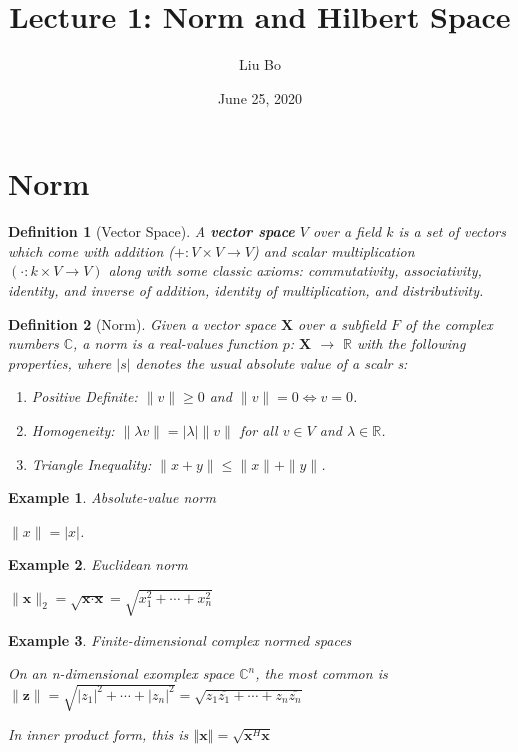 \documentclass[11pt]{article}
\title{Lecture 1: Norm and Hilbert Space}
\author{Liu Bo}
\date{June 25, 2020}
\newtheorem{definition}{Definition}
\newtheorem{example}{Example}
\begin{document}
\maketitle

\section{Norm}
\begin{definition}[Vector Space]
A \textbf{vector space} $V$ over a field $k$ is a set of vectors which come with addition ($+: V\times V \to V$) and scalar multiplication $(\cdot: k\times V\to V)$ along with some classic axioms: commutativity, associativity, identity, and inverse of addition, identity of multiplication, and distributivity.
\end{definition}

\begin{definition}[Norm]
Given a vector space $\textbf{X}$ over a subfield $F$ of the complex numbers $\mathbb{C}$, a norm is a real-values function $p$: $\textbf{X}$  $\to$ $\mathbb{R}$ with the following properties, where $|s|$ denotes the usual absolute value of a scalr s:
\begin{enumerate}
\item Positive Definite: $\| v\| \geq 0$ and $\| v\| = 0 \iff v = 0$.
\item Homogeneity: $\| \lambda v\| = |\lambda| \| v\|$ for all $v\in V$ and $\lambda \in \mathbb{R}$.
\item Triangle Inequality: $\| x+y\| \leq \| x\| + \| y\|$.
\end{enumerate}

\end{definition}

\begin{example}{Absolute-value norm}

$\| x\| = |x|$.
\end{example}

\begin{example}{Euclidean norm}

$\| \textbf{x} \|_2 =\sqrt{\textbf{x} \cdot \textbf{x}}= \sqrt{x_1^2 + \cdots + x_n^2}$
\end{example}

\begin{example}{Finite-dimensional complex normed spaces}

On an n-dimensional exomplex space $\mathbb{C}^n$, the most common is 
$\| \textbf{z}\| = \sqrt{|z_1|^2 + \cdots + |z_n|^2} = \sqrt{z_1\overline{z_1} +\cdots + z_n\overline{z_n}}$

In inner product form, this is $\left\Vert \textbf{x} \right\Vert = \sqrt{\textbf{x}^H\textbf{x}}$
\end{example}
\end{document}
